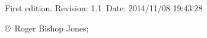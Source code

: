 \begin{centering}

{\footnotesize

First edition. $ $Revision: 1.1 $~$Date: 2014/11/08 19:43:28 $ $

\vspace{0.2in}

\copyright\ Roger Bishop Jones;

}%

\end{centering}
